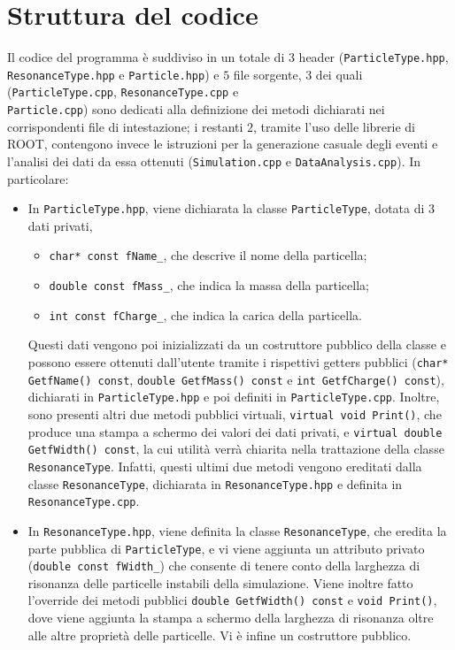 \documentclass{article}
\begin{document}
\section{Struttura del codice}
\label{Struttura del codice}
Il codice del programma è suddiviso in un totale di \(3\) header (\texttt{ParticleType.hpp}, \texttt{ResonanceType.hpp} e \texttt{Particle.hpp}) e \(5\) file sorgente, \(3\) dei quali (\texttt{ParticleType.cpp}, \texttt{ResonanceType.cpp} e \\ \texttt{Particle.cpp}) sono dedicati alla definizione dei metodi dichiarati nei corrispondenti file di intestazione; i restanti \(2\), tramite l'uso delle librerie di ROOT, contengono invece le istruzioni per la generazione casuale degli eventi e l'analisi dei dati da essa ottenuti (\texttt{Simulation.cpp} e \texttt{DataAnalysis.cpp}). In particolare:
\begin{itemize}
    \item In \texttt{ParticleType.hpp}, viene dichiarata la classe \texttt{ParticleType}, dotata di \(3\) dati privati,
    \begin{itemize}
        \item \texttt{char* const fName\_}, che descrive il nome della particella;
        \item \texttt{double const fMass\_}, che indica la massa della particella;
        \item \texttt{int const fCharge\_}, che indica la carica della particella.
    \end{itemize}
    Questi dati vengono poi inizializzati da un costruttore pubblico della classe e possono essere ottenuti dall'utente tramite i rispettivi getters pubblici (\texttt{char* GetfName() const}, \texttt{double GetfMass() const} e \texttt{int GetfCharge() const}), dichiarati in \texttt{ParticleType.hpp} e poi definiti in \texttt{ParticleType.cpp}. Inoltre, sono presenti altri due metodi pubblici virtuali, \texttt{virtual void Print()}, che produce una stampa a schermo dei valori dei dati privati, e \texttt{virtual double GetfWidth() const}, la cui utilità verrà chiarita nella trattazione della classe \texttt{ResonanceType}. Infatti, questi ultimi due metodi vengono ereditati dalla classe \texttt{ResonanceType}, dichiarata in \texttt{ResonanceType.hpp} e definita in \texttt{ResonanceType.cpp}.
    \item In \texttt{ResonanceType.hpp}, viene definita la classe \texttt{ResonanceType}, che eredita la parte pubblica di \texttt{ParticleType}, e vi viene aggiunta un attributo privato (\texttt{double const fWidth\_}) che consente di tenere conto della larghezza di risonanza delle particelle instabili della simulazione. Viene inoltre fatto l'override dei metodi pubblici \texttt{double GetfWidth() const} e \texttt{void Print()}, dove viene aggiunta la stampa a schermo della larghezza di risonanza oltre alle altre proprietà delle particelle. Vi è infine un costruttore pubblico. 

\end{itemize}
\end{document}
